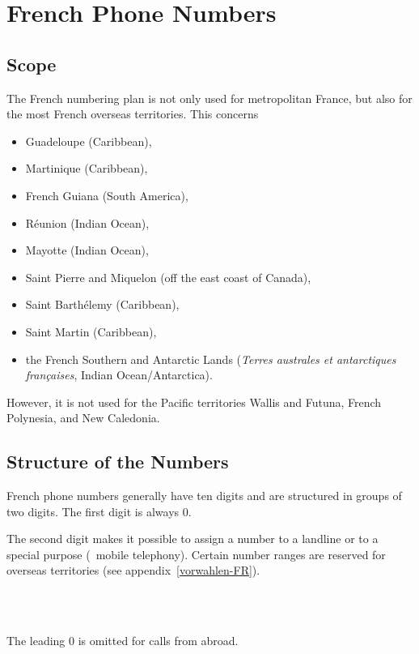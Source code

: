 \documentclass[numbers=noenddot]{scrreprt}
\newcommand\Abschnittsliteratur[1]{\bgroup
\small
\raggedright
\printbibliography[heading=subbibnumbered,keyword=#1]
\egroup}
\newcommand\UeberschriftGeltungsbereich{\section{Scope}}
\newcommand\UeberschriftAufbau{\section{Structure of the Numbers}}
\newcommand*\sieheAnhang[1]{(see appendix~\ref{#1})}
\begin{document}
\Abschnittsliteratur{austrian}

\chapter{French Phone Numbers}
\UeberschriftGeltungsbereich \label{FR-bereich}
The French numbering plan
\cite{ARCEP}
is not only used for metropolitan France, but also for the most French overseas territories. This concerns
\begin{itemize}
\item Guadeloupe (Caribbean),
\item Martinique (Caribbean),
\item French Guiana (South America),
\item R\'eunion (Indian Ocean),
\item Mayotte (Indian Ocean),
\item Saint Pierre and Miquelon (off the east coast of Canada),
\item Saint Barth\'elemy (Caribbean),
\item Saint Martin (Caribbean),
\item the French Southern and Antarctic Lands (\emph{\foreignlanguage{french}{Terres australes et antarctiques françaises}}, Indian Ocean/Antarctica).
\end{itemize}
However, it is not used for the Pacific territories Wallis and Futuna, French Polynesia, and New Caledonia.

\UeberschriftAufbau
French phone numbers generally have ten digits and are structured in groups of two digits. The first digit is always 0.
\begin{sidebyside}
\end{sidebyside}
The second digit makes it possible to assign a number to a landline or to a special purpose (\eg\ mobile telephony). Certain number ranges are reserved for overseas territories
\sieheAnhang{vorwahlen-FR}.
\begin{sidebyside}
   \\
   \\
\end{sidebyside}

The leading 0 is omitted for calls from abroad.
\begin{sidebyside}
\end{sidebyside}
\end{document}

